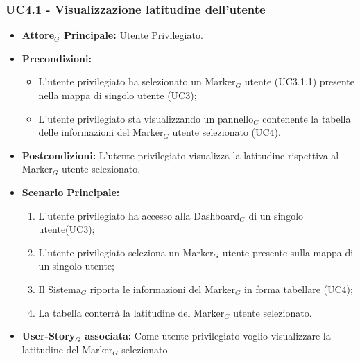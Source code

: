 \documentclass[10pt]{article}
\begin{document}
\begin{justify}
\subsubsection{\textbf{UC4.1 - Visualizzazione latitudine dell'utente}}
\label{UC4.1}
\begin{itemize}
     \item \textbf{Attore$_G$ Principale:} Utente Privilegiato.
     \item \textbf{Precondizioni:}
        \begin{itemize}
          \item L'utente privilegiato ha selezionato un Marker$_G$ utente (UC3.1.1) presente nella mappa di singolo utente (UC3);
          \item L'utente privilegiato sta visualizzando un pannello$_G$ contenente la tabella delle informazioni del Marker$_G$ utente selezionato (UC4).
        \end{itemize}
      \item \textbf{Postcondizioni:} L'utente privilegiato visualizza la latitudine rispettiva al Marker$_G$ utente selezionato. 
      \item \textbf{Scenario Principale:}
        \begin{enumerate}
            \item L'utente privilegiato ha accesso alla Dashboard$_G$ di un singolo utente(UC3);
            \item L'utente privilegiato seleziona un Marker$_G$ utente presente sulla mappa di un singolo utente;
            \item Il Sistema$_G$ riporta le informazioni del Marker$_G$ in forma tabellare (UC4);
            \item La tabella conterrà la latitudine del Marker$_G$ utente selezionato.
        \end{enumerate}
     \item \textbf{User-Story$_G$ associata:}
       Come utente privilegiato voglio visualizzare la latitudine del Marker$_G$ selezionato.
\end{itemize}


\end{justify}
\end{document}
